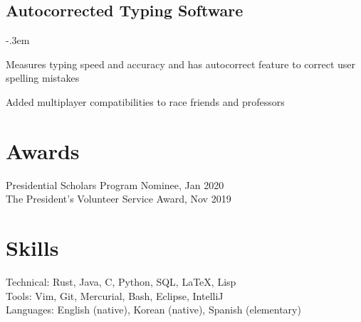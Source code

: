 \documentclass{article}
\let\olditemize=\itemize \let\endolditemize=\enditemize
\renewenvironment{itemize}{\olditemize[topsep=0em] \itemsep-.3em}{\endolditemize}
\begin{document}
\subsection{Autocorrected Typing Software}
\begin{itemize}
  \item Measures typing speed and accuracy and has autocorrect feature to correct user spelling mistakes 
  \item Added multiplayer compatibilities to race friends and professors
\end{itemize}

\section{Awards}
{Presidential Scholars Program Nominee, Jan 2020}\quad{} \\
{The President’s Volunteer Service Award, Nov 2019}\quad{}

\section{Skills}
Technical:
  Rust, Java, C, Python, SQL, LaTeX, Lisp \\
Tools:
  Vim, Git, Mercurial, Bash, Eclipse, IntelliJ \\
Languages:
  English (native), Korean (native), Spanish (elementary)
\end{document}
